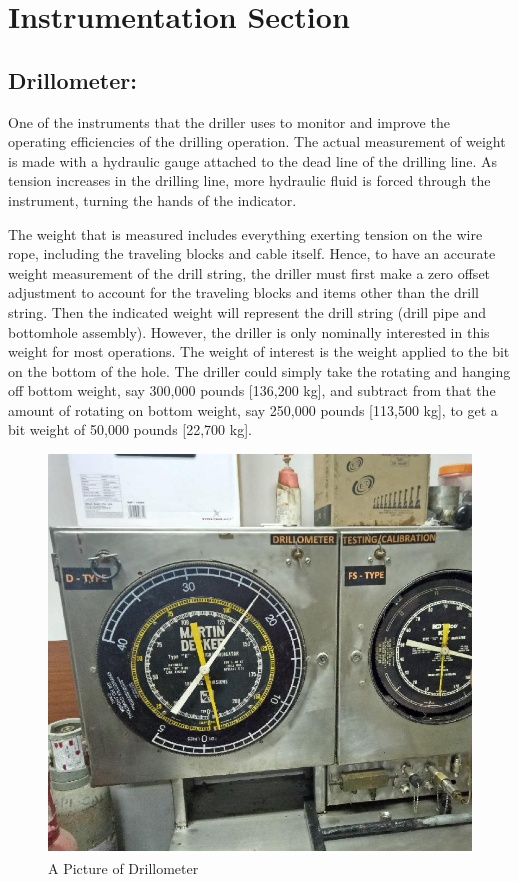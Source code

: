 \chapter{Instrumentation Section}


\section*{Drillometer:} 

One of the instruments that the driller uses to monitor
and improve the operating efficiencies of the drilling operation. The
actual measurement of weight is made with a hydraulic gauge
attached to the dead line of the drilling line. As tension increases in
the drilling line, more hydraulic fluid is forced through the
instrument, turning the hands of the indicator. 

\vspace{1em}

The weight that is measured includes everything exerting tension on the wire rope,
including the traveling blocks and cable itself. Hence, to have an
accurate weight measurement of the drill string, the driller must first
make a zero offset adjustment to account for the traveling blocks and
items other than the drill string. Then the indicated weight will
represent the drill string (drill pipe and bottomhole assembly).
However, the driller is only nominally interested in this weight for
most operations. The weight of interest is the weight applied to the
bit on the bottom of the hole. The driller could simply take the
rotating and hanging off bottom weight, say 300,000 pounds
[136,200 kg], and subtract from that the amount of rotating on bottom
weight, say 250,000 pounds [113,500 kg], to get a bit weight of
50,000 pounds [22,700 kg].

\begin{figure}[h]
\includegraphics[scale=0.3]{images/drillometer}
\centering 
\caption{A Picture of Drillometer}
\end{figure}

